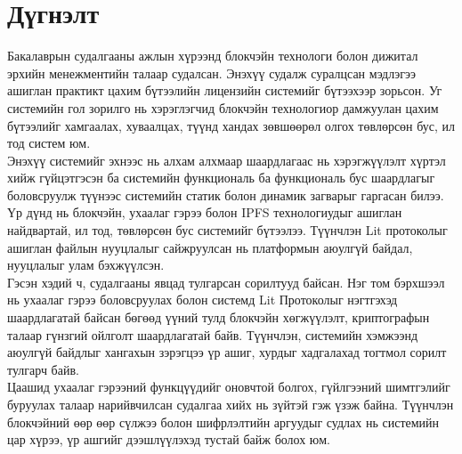 \chapter{Дүгнэлт}
\indent Бакалаврын судалгааны ажлын хүрээнд блокчэйн технологи болон дижитал эрхийн менежментийн талаар судалсан. Энэхүү судалж суралцсан мэдлэгээ ашиглан практикт цахим бүтээлийн лицензийн системийг бүтээхээр зорьсон. Уг системийн гол зорилго нь хэрэглэгчид блокчэйн технологиор дамжуулан цахим бүтээлийг хамгаалах, хуваалцах, түүнд хандах зөвшөөрөл олгох төвлөрсөн бус, ил тод систем юм.
\\ \indent Энэхүү системийг эхнээс нь алхам алхмаар шаардлагаас нь хэрэгжүүлэлт хүртэл хийж гүйцэтгэсэн ба системийн функциональ ба функциональ бус шаардлагыг боловсруулж түүнээс системийн статик болон динамик загварыг гаргасан билээ. Үр дүнд нь блокчэйн, ухаалаг гэрээ болон IPFS технологиудыг ашиглан найдвартай, ил тод, төвлөрсөн бус системийг бүтээлээ. Түүнчлэн Lit протоколыг ашиглан файлын нууцлалыг сайжруулсан нь платформын аюулгүй байдал, нууцлалыг улам бэхжүүлсэн.
\\ \indent Гэсэн хэдий ч, судалгааны явцад тулгарсан сорилтууд байсан. Нэг том бэрхшээл нь ухаалаг гэрээ боловсруулах болон системд Lit Протоколыг нэгтгэхэд шаардлагатай байсан бөгөөд үүний тулд блокчэйн хөгжүүлэлт, криптографын талаар гүнзгий ойлголт шаардлагатай байв. Түүнчлэн, системийн хэмжээнд аюулгүй байдлыг хангахын зэрэгцээ үр ашиг, хурдыг хадгалахад тогтмол сорилт тулгарч байв.
\\ \indent  Цаашид ухаалаг гэрээний функцүүдийг оновчтой болгох, гүйлгээний шимтгэлийг буруулах талаар нарийвчилсан судалгаа хийх нь зүйтэй гэж үзэж байна. Түүнчлэн блокчэйний өөр өөр сүлжээ болон шифрлэлтийн аргуудыг судлах нь системийн цар хүрээ, үр ашгийг дээшлүүлэхэд тустай байж болох юм.